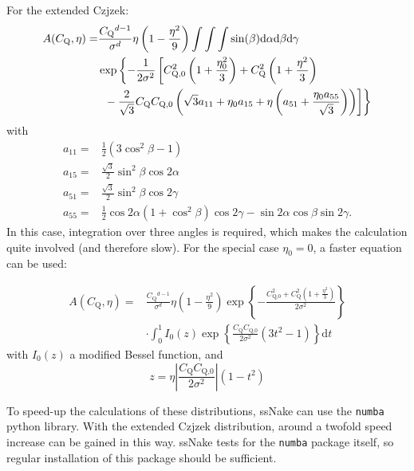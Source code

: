 \documentclass[11pt,a4paper]{article}
\begin{document}
For the extended Czjzek:
\begin{align}
  A(C_\text{Q},\eta) = & \frac{C_\text{Q}{}^{d-1}}{\sigma^d} \eta \left(1 - \frac{\eta^2}{9} \right)
  \int \int \int \sin(\beta) \text{d}\alpha \text{d}\beta \text{d}\gamma \nonumber \\
  & \exp \left\{ -\frac{1}{2\sigma^2} \left[ C_\text{Q,0}^2 \left(1 + \frac{\eta_0^2}{3}\right) +
  C_\text{Q}^2 \left(1+ \frac{\eta^2}{3}\right) \right.\right. \\
  & \left.\vphantom{\frac{a^1}{1}} \left.\vphantom{\frac{a^1}{1}} - \frac{2}{\sqrt{3}} C_\text{Q} C_\text{Q,0} 
  \left( \sqrt{3} a_{11} + \eta_0 a_{15} + \eta \left(
 a_{51} + \frac{\eta_0 a_{55}}{\sqrt{3}} \right) \right) \right] \right\} \nonumber
\end{align}
with
\begin{align}
  a_{11} = & \frac{1}{2} (3\cos^2\beta - 1)\\
  a_{15} = & \frac{\sqrt{3}}{2} \sin^2\beta \cos 2\alpha \\
  a_{51} = & \frac{\sqrt{3}}{2} \sin^2\beta \cos 2\gamma \\
  a_{55} = & \frac{1}{2} \cos 2\alpha (1 + \cos^2\beta) \cos2\gamma - \sin 2 \alpha \cos \beta \sin
  2 \gamma.
\end{align}
In this case, integration over three angles is required, which makes the calculation quite involved
(and therefore slow). For the special case $\eta_0=0$, a faster equation can be used:

\begin{align}
  A(C_\text{Q},\eta) = & \frac{C_\text{Q}{}^{d-1}}{\sigma^d} \eta \left(1 - \frac{\eta^2}{9} \right)
  \exp \left\{ - \frac{C_\text{Q,0}^2 + C_\text{Q}^2 (1 + \frac{\eta^2}{3})}{2\sigma^2} \right\}\\
  & \cdot \int_0^1 I_0(z) \exp \left\{ \frac{C_\text{Q}C_\text{Q,0}}{2\sigma^2} (3t^2 - 1)   \right\} \text{d}t
\end{align}
with $I_0(z)$ a modified Bessel function, and
\begin{equation}
  z = \eta \left| \frac{C_\text{Q}C_\text{Q,0}}{2\sigma^2}\right| (1 - t^2)
\end{equation}

To speed-up the calculations of these distributions, ssNake can use the \texttt{numba} python library. With
the extended Czjzek distribution, around a twofold speed increase can be gained in this way. ssNake
tests for the \texttt{numba} package itself, so regular installation of this package should be sufficient.
\end{document}
